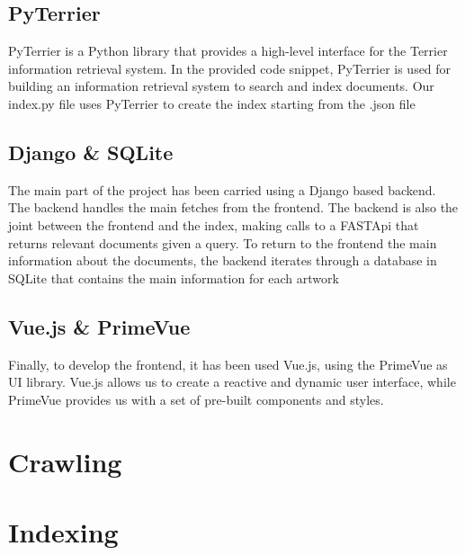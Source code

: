 \documentclass[12pt]{spieman}  %
\begin{document}
\begin{spacing}{1}
    \subsection{PyTerrier}
    PyTerrier is a Python library that provides a high-level interface for the Terrier information retrieval system. In the provided code snippet, PyTerrier is used for building an information retrieval system to search and index documents.\newline
    Our index.py file uses PyTerrier to create the index starting from the .json file

    \subsection{Django \& SQLite}
    The main part of the project has been carried using a Django based backend. The backend handles the main fetches from the frontend.
    The backend is also the joint between the frontend and the index, making calls to a FASTApi that returns relevant documents given a query.\newline
    To return to the frontend the main information about the documents, the backend iterates through a database in SQLite that contains the main information for each artwork

    \subsection{Vue.js \& PrimeVue}
    Finally, to develop the frontend, it has been used Vue.js, using the PrimeVue as UI library. Vue.js allows us to create a reactive and dynamic user interface, while PrimeVue provides us with a set of pre-built components and styles.

    \section{Crawling}\label{sec:crawling}
    \section{Indexing}\label{sec:indexing}


\end{spacing}
\end{document}
